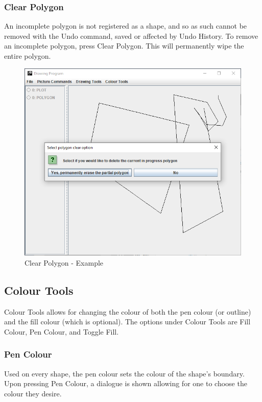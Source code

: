 \documentclass[12pt]{article} %
\begin{document}
\subsubsection{Clear Polygon}
An incomplete polygon is not registered as a shape, and so as such cannot be removed with the Undo command, saved or affected by Undo History. To remove an incomplete polygon, press Clear Polygon. This will permanently wipe the entire polygon.
\begin{figure}[H]
\caption{Clear Polygon - Example}
\centering
\includegraphics[scale=0.75]{pictures/clickFourthWindow.PNG}
\end{figure}

\subsection{Colour Tools}
Colour Tools allows for changing the colour of both the pen colour (or outline) and the fill colour (which is optional). The options under Colour Tools are Fill Colour, Pen Colour, and Toggle Fill.

\subsubsection{Pen Colour}
Used on every shape, the pen colour sets the colour of the shape's boundary. Upon pressing Pen Colour, a dialogue is shown allowing for one to choose the colour they desire.
\end{document}
